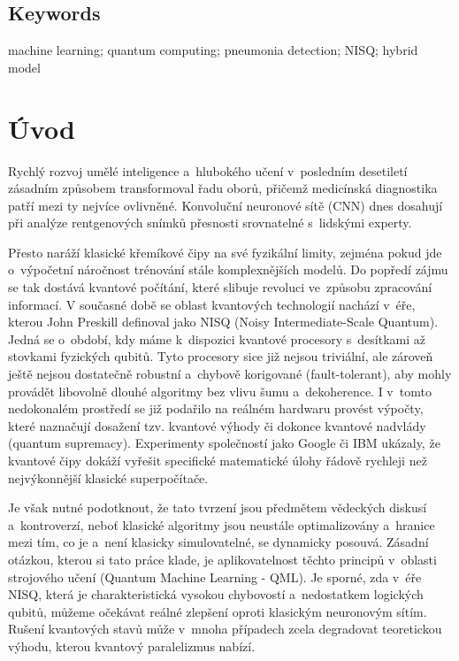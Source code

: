\documentclass[12pt, a4paper]{report}
\begin{document}
\section*{Keywords}
machine learning; quantum computing; pneumonia detection; NISQ; hybrid model

\newpage
\tableofcontents

\newpage

\chapter{Úvod} \label{chap:uvod}

Rychlý rozvoj umělé inteligence a~hlubokého učení v~posledním desetiletí zásadním způsobem transformoval řadu oborů, přičemž medicínská diagnostika patří mezi ty nejvíce ovlivněné.
Konvoluční neuronové sítě (CNN) dnes dosahují při analýze rentgenových snímků přesnosti srovnatelné s~lidskými experty.

Přesto naráží klasické křemíkové čipy na své fyzikální limity, zejména pokud jde o~výpočetní náročnost trénování stále komplexnějších modelů.
Do popředí zájmu se tak dostává kvantové počítání, které slibuje revoluci ve~způsobu zpracování informací.
V současné době se oblast kvantových technologií nachází v~éře, kterou John Preskill definoval jako NISQ (Noisy Intermediate-Scale Quantum).
Jedná se o~období, kdy máme k~dispozici kvantové procesory s~desítkami až stovkami fyzických qubitů.
Tyto procesory sice již nejsou triviální, ale zároveň ještě nejsou dostatečně robustní a~chybově korigované (fault-tolerant), aby mohly provádět libovolně dlouhé algoritmy bez vlivu šumu a~dekoherence.
I v~tomto nedokonalém prostředí se již podařilo na reálném hardwaru provést výpočty, které naznačují dosažení tzv.
kvantové výhody či dokonce kvantové nadvlády (quantum supremacy). Experimenty společností jako Google či IBM ukázaly, že kvantové čipy dokáží vyřešit specifické matematické úlohy řádově rychleji než nejvýkonnější klasické superpočítače.

Je však nutné podotknout, že tato tvrzení jsou předmětem vědeckých diskusí a~kontroverzí, neboť klasické algoritmy jsou neustále optimalizovány a~hranice mezi tím, co je a~není klasicky simulovatelné, se dynamicky posouvá.
Zásadní otázkou, kterou si tato práce klade, je aplikovatelnost těchto principů v~oblasti strojového učení (Quantum Machine Learning - QML).
Je sporné, zda v~éře NISQ, která je charakteristická vysokou chybovostí a~nedostatkem logických qubitů, můžeme očekávat reálné zlepšení oproti klasickým neuronovým sítím.
Rušení kvantových stavů může v~mnoha případech zcela degradovat teoretickou výhodu, kterou kvantový paralelizmus nabízí.
\end{document}
